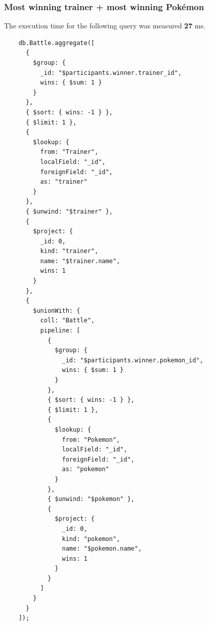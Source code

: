 \documentclass[11pt]{article}
\begin{document}
    \subsubsection{Most winning trainer + most winning Pokémon}
    The execution time for the following query was measured \textbf{27} ms.
    \begin{lstlisting}
    db.Battle.aggregate([
      {
        $group: {
          _id: "$participants.winner.trainer_id",
          wins: { $sum: 1 }
        }
      },
      { $sort: { wins: -1 } },
      { $limit: 1 },
      {
        $lookup: {
          from: "Trainer",
          localField: "_id",
          foreignField: "_id",
          as: "trainer"
        }
      },
      { $unwind: "$trainer" },
      {
        $project: {
          _id: 0,
          kind: "trainer",
          name: "$trainer.name",
          wins: 1
        }
      },
      {
        $unionWith: {
          coll: "Battle",
          pipeline: [
            {
              $group: {
                _id: "$participants.winner.pokemon_id",
                wins: { $sum: 1 }
              }
            },
            { $sort: { wins: -1 } },
            { $limit: 1 },
            {
              $lookup: {
                from: "Pokemon",
                localField: "_id",
                foreignField: "_id",
                as: "pokemon"
              }
            },
            { $unwind: "$pokemon" },
            {
              $project: {
                _id: 0,
                kind: "pokemon",
                name: "$pokemon.name",
                wins: 1
              }
            }
          ]
        }
      }
    ]);
    \end{lstlisting}

\end{document}
